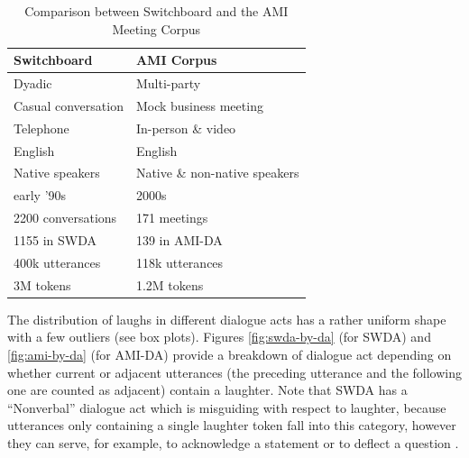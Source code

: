 \documentclass[11pt,a4paper]{article}
\begin{document}
\begin{table}[]
\centering
\begin{tabular}{@{}ll@{}}
\toprule
\textbf{Switchboard}       & \textbf{AMI Corpus}                     \\ \midrule
Dyadic                     & Multi-party                             \\
Casual conversation        & Mock business meeting                   \\
Telephone                  & In-person \& video                      \\ \midrule
English                    & English                                 \\ 
Native speakers            & Native \& non-native speakers           \\ 
early '90s                 & 2000s                                   \\ \midrule
2200 conversations         & 171 meetings                            \\
  \hspace{1em} 1155 in SWDA               & \hspace{1em} 139 in AMI-DA                           \\
400k utterances             & 118k utterances                         \\
3M tokens                  & 1.2M tokens                             \\ \bottomrule
\end{tabular}
  \caption{Comparison between Switchboard and the AMI Meeting Corpus}
  \label{table:corpora}
\end{table}

The distribution of laughs in different dialogue acts has a rather uniform shape with a few outliers (see box plots). Figures \ref{fig:swda-by-da} (for SWDA) and \ref{fig:ami-by-da} (for AMI-DA) provide a breakdown of dialogue act depending on whether current or adjacent utterances (the preceding utterance and the following one are counted as adjacent) contain a laughter. Note that SWDA has a ``Nonverbal'' dialogue act which is misguiding with respect to laughter, because utterances only containing a single laughter token fall into this category, however they can serve, for example, to acknowledge a statement or to deflect a question  \citep{mazzocconi2019phd}.
\end{document}
